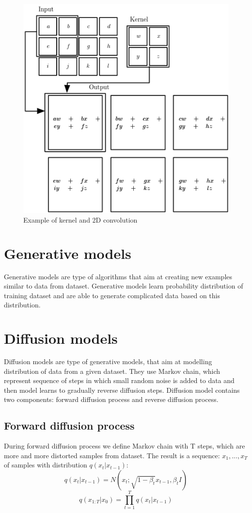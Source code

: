 \documentclass[11pt,a4paper]{report}
\begin{document}
\begin{figure}[H]
	\centering
	\includegraphics[scale=0.6]{images/convolution}
    \caption{Example of kernel and 2D convolution \cite{convolution}}
\end{figure} 

\section{Generative models}
Generative models are type of algorithms that aim at creating new examples similar to data from dataset. Generative models learn probability distribution of training dataset and are able to generate complicated data based on this distribution.
\section{Diffusion models}
Diffusion models are type of generative models, that aim at modelling distribution of data from a given dataset. They use Markov chain, which represent sequence of steps in which small random noise is added to data and then model learns to gradually reverse diffusion steps. Diffusion model contains two components: forward diffusion process and reverse diffusion process.

\subsection{Forward diffusion process}
During forward diffusion process we define Markov chain with T steps, which are more and more distorted samples from dataset. The result is a sequence: $x_1,..., x_T$  of samples with distribution $q(x_t|x_{t-1})$:
\[ q(x_t|x_{t-1}) = N(x_t;\sqrt{1-\beta_t}x_{t-1}, \beta_tI) \]
\[ q(x_{1:T}|x_0) = \prod_{t=1}^{T}{q(x_t|x_{t-1})} \]
\end{document}
